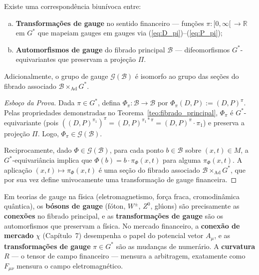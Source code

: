\begin{teo}\label{teo:corresp}
Existe uma correspond\^encia biun\'ivoca entre:
\begin{enumerate}[(a)]
 \item \textbf{Transforma\c{c}\~oes de gauge} no sentido financeiro ---
 fun\c{c}\~oes $\pi: [0,\infty[\, \to \mathbb{R}$ em $G^*$ que
 mapeiam gauges em gauges via (\ref{eq:D_pi})--(\ref{eq:P_pi});
 \item \textbf{Automorfismos de gauge} do fibrado principal $\mathcal{B}$ ---
 difeomorfismos $G^*$-equivariantes que preservam a proje\c{c}\~ao
 $\Pi$.
\end{enumerate}
Adicionalmente, o grupo de gauge $\mathcal{G}(\mathcal{B})$ \'e isomorfo
ao grupo das se\c{c}\~oes do fibrado associado
$\mathcal{B} \times_{\operatorname{Ad}} G^*$.
\end{teo}

\begin{proof}[Esbo\c{c}o da Prova]
Dada $\pi \in G^*$, defina $\Phi_\pi: \mathcal{B} \to \mathcal{B}$ por
$\Phi_\pi(D, P) := (D, P)^\pi$. Pelas propriedades demonstradas no
Teorema~\ref{teo:fibrado_principal}, $\Phi_\pi$ \'e $G^*$-equivariante
(pois $((D,P)^{\pi_1})^{\pi} = (D,P)^{\pi_1 * \pi} = (D,P)^\pi \cdot
\pi_1$) e preserva a proje\c{c}\~ao $\Pi$. Logo, $\Phi_\pi \in
\mathcal{G}(\mathcal{B})$.

Reciprocamente, dado $\Phi \in \mathcal{G}(\mathcal{B})$, para cada
ponto $b \in \mathcal{B}$ sobre $(x,t) \in M$, a $G^*$-equivari\^ancia
implica que $\Phi(b) = b \cdot \pi_{\Phi}(x,t)$ para alguma $\pi_\Phi(x,t)$.
A aplica\c{c}\~ao $(x,t) \mapsto \pi_\Phi(x,t)$ \'e uma se\c{c}\~ao do
fibrado associado $\mathcal{B} \times_{\operatorname{Ad}} G^*$, que por
sua vez define univocamente uma transforma\c{c}\~ao de gauge financeira.
\end{proof}

\begin{obs}
Em teorias de gauge na f\'isica (eletromagnetismo, for\c{c}a fraca,
cromodin\^amica qu\^antica), os \textbf{b\'osons de gauge} (f\'oton, $W^\pm$,
$Z^0$, gl\'uons) s\~ao precisamente as \textbf{conex\~oes} no fibrado
principal, e as \textbf{transforma\c{c}\~oes de gauge} s\~ao os
automorfismos que preservam a f\'isica. No mercado financeiro, a
\textbf{conex\~ao de mercado} $\chi$ (Cap\'itulo~7) desempenha o papel
do potencial vetor $A_\mu$, e as \textbf{transforma\c{c}\~oes de gauge}
$\pi \in G^*$ s\~ao as mudan\c{c}as de numer\'ario. A \textbf{curvatura}
$R$ --- o tensor de campo financeiro --- mensura a arbitragem, exatamente
como $F_{\mu\nu}$ mensura o campo eletromagn\'etico.
\end{obs}

